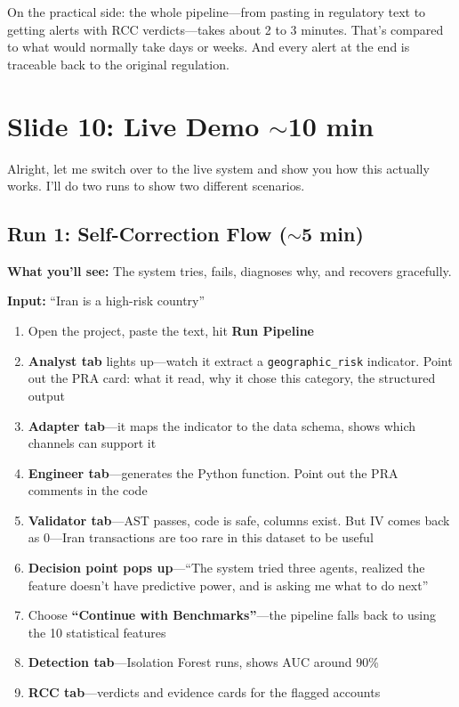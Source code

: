 \documentclass[11pt, a4paper]{article}
\newcommand{\timing}[1]{{\hfill\small\color{gray}#1}}
\begin{document}
On the practical side: the whole pipeline---from pasting in regulatory text to getting alerts with RCC verdicts---takes about 2 to 3 minutes. That's compared to what would normally take days or weeks. And every alert at the end is traceable back to the original regulation.

\section{Slide 10: Live Demo \timing{$\sim$10 min}}

Alright, let me switch over to the live system and show you how this actually works. I'll do two runs to show two different scenarios.

\subsection{Run 1: Self-Correction Flow ($\sim$5 min)}

\textbf{What you'll see:} The system tries, fails, diagnoses why, and recovers gracefully.

\textbf{Input:} ``Iran is a high-risk country''

\begin{enumerate}[leftmargin=1.5em, itemsep=0.3em]
  \item Open the project, paste the text, hit \textbf{Run Pipeline}
  \item \textbf{Analyst tab} lights up---watch it extract a \texttt{geographic\_risk} indicator. Point out the PRA card: what it read, why it chose this category, the structured output
  \item \textbf{Adapter tab}---it maps the indicator to the data schema, shows which channels can support it
  \item \textbf{Engineer tab}---generates the Python function. Point out the PRA comments in the code
  \item \textbf{Validator tab}---AST passes, code is safe, columns exist. But IV comes back as 0---Iran transactions are too rare in this dataset to be useful
  \item \textbf{Decision point pops up}---``The system tried three agents, realized the feature doesn't have predictive power, and is asking me what to do next''
  \item Choose \textbf{``Continue with Benchmarks''}---the pipeline falls back to using the 10 statistical features
  \item \textbf{Detection tab}---Isolation Forest runs, shows AUC around 90\%
  \item \textbf{RCC tab}---verdicts and evidence cards for the flagged accounts
\end{enumerate}
\end{document}
